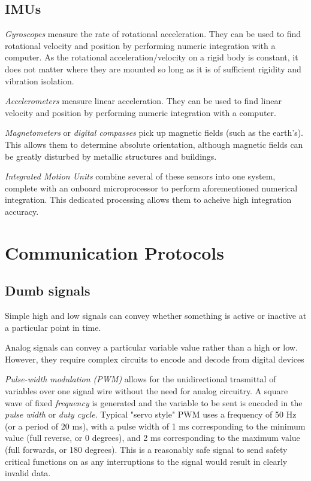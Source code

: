 \subsection{IMUs}
\begin{asparaenum}[a)]
\item \textit{Gyroscopes} measure the rate of rotational acceleration. They can be used to find rotational velocity and position by performing numeric integration with a computer. As the rotational acceleration/velocity on a rigid body is constant, it does not matter where they are mounted so long as it is of sufficient rigidity and vibration isolation.
\item \textit{Accelerometers} measure linear acceleration. They can be used to find linear velocity and position by performing numeric integration with a computer.
\item \textit{Magnetometers} or \textit{digital compasses} pick up magnetic fields (such as the earth's). This allows them to determine absolute orientation, although magnetic fields can be greatly disturbed by metallic structures and buildings.
\item \textit{Integrated Motion Units} combine several of these sensors into one system, complete with an onboard microprocessor to perform aforementioned numerical integration. This dedicated processing allows them to acheive high integration accuracy.
\end{asparaenum}


\section{Communication Protocols}

\subsection{Dumb signals} %

\begin{asparaenum}[a)]
\item Simple high and low signals can convey whether something is active or inactive at a particular point in time.
\item Analog signals can convey a particular variable value rather than a high or low. However, they require complex circuits to encode and decode from digital devices
\item \textit{Pulse-width modulation (PWM)} allows for the unidirectional trasmittal of variables over one signal wire without the need for analog circuitry. A square wave of fixed \textit{frequency} is generated and the variable to be sent is encoded in the \textit{pulse width} or \textit{duty cycle}. Typical "servo style" PWM uses a frequency of 50 Hz (or a period of 20 ms), with a pulse width of 1 ms corresponding to the minimum value (full reverse, or 0 degrees), and 2 ms corresponding to the maximum value (full forwards, or 180 degrees). This is a reasonably safe signal to send safety critical functions on as any interruptions to the signal would result in clearly invalid data.
\end{asparaenum}

